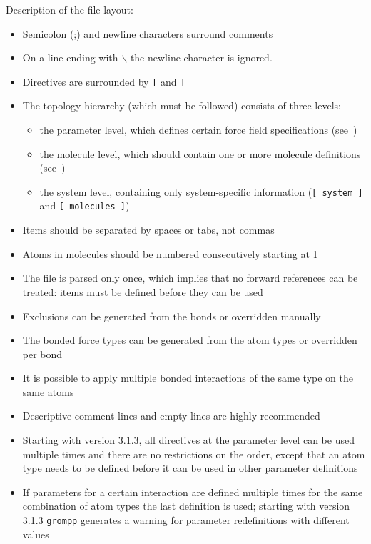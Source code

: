 Description of the file layout:
\begin{itemize}
\item Semicolon (;) and newline characters surround comments
\item On a line ending with $\backslash$ the newline character is ignored.
\item Directives are surrounded by {\tt [} and {\tt ]}
\item The topology hierarchy (which must be followed) consists of three levels:
\begin{itemize}
\item the parameter level, which defines certain force field specifications 
      (see~)
\item the molecule level, which should contain one or more molecule
      definitions (see~)
\item the system level, containing only system-specific information 
      ({\tt [~system~]} and {\tt [~molecules~]})
\end{itemize}
\item Items should be separated by spaces or tabs, not commas
\item Atoms in molecules should be numbered consecutively starting at 1
\item The file is parsed only once, which implies that no forward
      references can be treated: items must be defined before they
      can be used
\item Exclusions can be generated from the bonds or
      overridden manually
\item The bonded force types can be generated from the atom types or
      overridden per bond
\item It is possible to apply multiple bonded interactions of the same type
      on the same atoms
\item Descriptive comment lines and empty lines are highly recommended
\item Starting with {\gromacs} version 3.1.3, all directives at the
      parameter level can be used multiple times and there are no
      restrictions on the order, except that an atom type needs to be
      defined before it can be used in other parameter definitions
\item If parameters for a certain interaction are defined multiple times
      for the same combination of atom types the last definition is used;
      starting with {\gromacs} version 3.1.3 {\tt grompp} generates a
      warning for parameter redefinitions with different values

\end{itemize}
